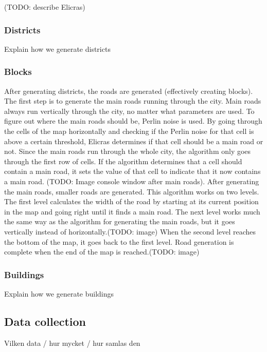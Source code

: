 		\par
		(TODO: describe Elicras)
		
		\subsubsection{Districts}
		Explain how we generate districts
		
		\subsubsection{Blocks}
		After generating districts, the roads are generated (effectively creating blocks). The first step is to generate the main roads running through the city. Main roads always run vertically through the city, no matter what parameters are used. To figure out where the main roads should be, Perlin noise is used. By going through the cells of the map horizontally and checking if the Perlin noise for that cell is above a certain threshold, Elicras determines if that cell should be a main road or not. Since the main roads run through the whole city, the algorithm only goes through the first row of cells. If the algorithm determines that a cell should contain a main road, it sets the value of that cell to indicate that it now contains a main road. (TODO: Image console window after main roads). After generating the main roads, smaller roads are generated. This algorithm works on two levels. The first level calculates the width of the road by starting at its current position in the map and going right until it finds a main road. The next level works much the same way as the algorithm for generating the main roads, but it goes vertically instead of horizontally.(TODO: image) When the second level reaches the bottom of the map, it goes back to the first level. Road generation is complete when the end of the map is reached.(TODO: image)
		
		\subsubsection{Buildings}
		Explain how we generate buildings

	\subsection{Data collection}
	Vilken data / hur mycket / hur samlas den